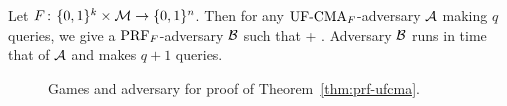 \begin{theorem}
Let $F{{\kern .05em}\colon{\kern .05em}}\{0,1\}^k\times{\cal M}\rightarrow\{0,1\}^n$. Then for any
$\textnormal{UF-CMA}_F$-adversary ${\mathcal A}$ making $q$ queries, we give a $\textnormal{PRF}_F$-adversary ${\mathcal B}$ such that
\bnm
   \le {} +  \;.
\enm
Adversary ${\mathcal B}$ runs in time that of ${\mathcal A}$ and makes $q+1$ queries.
\label{thm:prf-ufcma}
\end{theorem}

\begin{figure}
\centering
{}
\caption{Games and adversary for proof of Theorem~\ref{thm:prf-ufcma}.}
\label{fig:games-prf-ufcma}
\end{figure}

